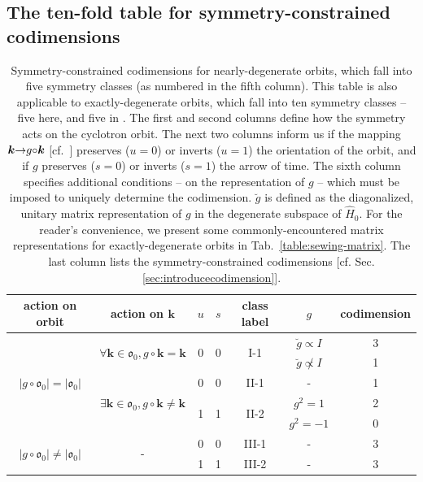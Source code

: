 \documentclass[aps, showpacs, twocolumn, notitlepage, superscriptaddress]{revtex4-1}
\begin{document}
\subsection{The ten-fold table for symmetry-constrained codimensions}\label{sec:tenfold}

\begin{table}
\begin{tabular}{|c|c|c|c|c|c|c|}
\hline 
action on orbit & action on $\boldsymbol{k}$  & $u$ & $s$  & class label & $g$  & codimension\tabularnewline
\hline 
\multirow{5}{*}{$|g\circ\mathfrak{o}_{0}|=|\mathfrak{o}_{0}|$} & \multirow{2}{*}{$\forall\boldsymbol{k}\in\mathfrak{o}_{0},g\circ\boldsymbol{k}=\boldsymbol{k}$} & \multirow{2}{*}{0} & \multirow{2}{*}{0} & \multirow{2}{*}{I-1} & $\breve{g}\propto I$  & 3\tabularnewline
\cline{6-7} 
 &  &  &  &  & $\breve{g}\not\propto I$  & 1\tabularnewline
\cline{2-7} 
 & \multirow{3}{*}{$\exists\boldsymbol{k}\in\mathfrak{o}_{0},g\circ\boldsymbol{k}\neq\boldsymbol{k}$} & 0 & 0 & II-1 & - & 1\tabularnewline
\cline{3-7} 
 &  & \multirow{2}{*}{1} & \multirow{2}{*}{1} & \multirow{2}{*}{II-2} & $g^{2}=1$  & 2\tabularnewline
\cline{6-7} 
 &  &  &  &  & $g^{2}=-1$  & 0\tabularnewline
\hline 
\multirow{2}{*}{$|g\circ\mathfrak{o}_{0}|\neq|\mathfrak{o}_{0}|$ } & \multirow{2}{*}{-} & 0 & 0 & III-1 & - & 3\tabularnewline
\cline{3-7} 
 &  & 1 & 1 & III-2 & - & 3\tabularnewline
\hline 
\end{tabular}
\caption{Symmetry-constrained codimensions for nearly-degenerate orbits, which fall into five symmetry classes (as numbered in the fifth column). This table is also applicable to exactly-degenerate orbits, which fall into ten symmetry classes -- five here, and five in  . The first and second columns define how the symmetry acts on the cyclotron orbit. The next two columns inform us if the mapping $\boldsymbol{k}{\rightarrow}g{\circ}\boldsymbol{k}$ [cf.\ ]  preserves ($u{=}0$) or inverts ($u{=}1$) the orientation of the orbit, and if $g$ preserves ($s{=}0$) or inverts ($s{=}1$) the arrow of time. The sixth column specifies additional conditions -- on the representation of $g$ -- which must be imposed to uniquely determine the codimension. $\breve{g}$ is defined as the diagonalized, unitary matrix representation of $g$ in the degenerate subspace of $\hat{H}_0$. For the reader's convenience, we present some commonly-encountered matrix representations for exactly-degenerate orbits in Tab.\ \ref{table:sewing-matrix}. The last column lists the symmetry-constrained codimensions [cf. Sec. \ref{sec:introducecodimension}]. \label{table:codimension-nearlydegen}}
\end{table}
\end{document}

